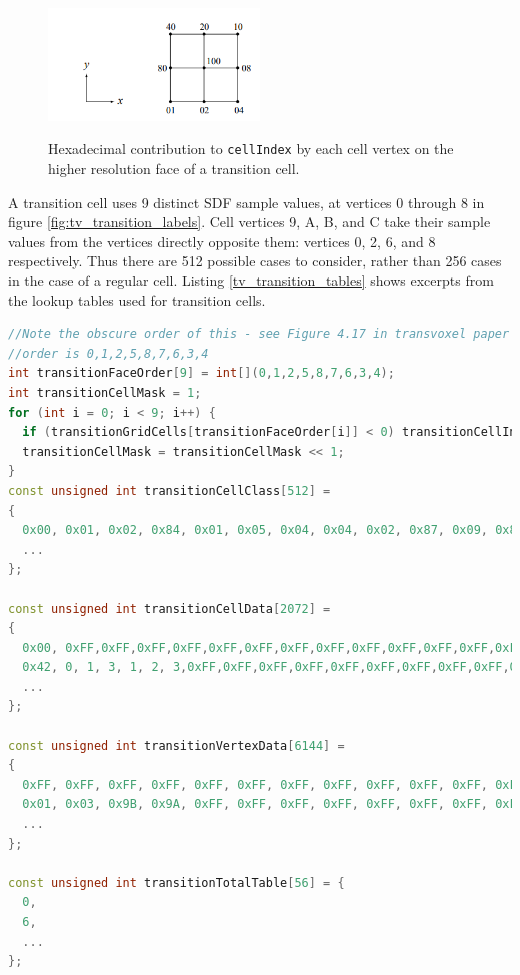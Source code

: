 \documentclass{article}
\begin{document}
\begin{figure}
  \caption{Hexadecimal contribution to \texttt{cellIndex} by each cell vertex on the higher resolution face of a transition cell.}
  \includegraphics[width=0.5\textwidth]{tv_transition_cellIndex.PNG}
  \label{fig:tv_transition_cellIndex}
\end{figure}


A transition cell uses 9 distinct SDF sample values, at vertices 0 through 8 in figure \ref{fig:tv_transition_labels}. Cell vertices 9, A, B, and C take their sample values from the vertices directly opposite them: vertices 0, 2, 6, and 8 respectively. Thus there are 512 possible cases to consider, rather than 256 cases in the case of a regular cell. Listing \ref{tv_transition_tables} shows excerpts from the lookup tables used for transition cells.

\begin{lstlisting}[language=C++, label={tv_transition_tables}, caption={Calculation of \texttt{transitionCellIndex}, and lookup tables for transition cells in the Transvoxel algorithm. An example of their usage is given below.}]
//Note the obscure order of this - see Figure 4.17 in transvoxel paper
//order is 0,1,2,5,8,7,6,3,4
int transitionFaceOrder[9] = int[](0,1,2,5,8,7,6,3,4);
int transitionCellMask = 1;
for (int i = 0; i < 9; i++) {
  if (transitionGridCells[transitionFaceOrder[i]] < 0) transitionCellIndex |= transitionCellMask;
  transitionCellMask = transitionCellMask << 1;
}
const unsigned int transitionCellClass[512] =
{
  0x00, 0x01, 0x02, 0x84, 0x01, 0x05, 0x04, 0x04, 0x02, 0x87, 0x09, 0x8C, 0x84, 0x0B, 0x05, 0x05,
  ...
};

const unsigned int transitionCellData[2072] =
{
  0x00, 0xFF,0xFF,0xFF,0xFF,0xFF,0xFF,0xFF,0xFF,0xFF,0xFF,0xFF,0xFF,0xFF,0xFF,0xFF,0xFF,0xFF,0xFF,0xFF,0xFF,0xFF,0xFF,0xFF,0xFF,0xFF,0xFF,0xFF,0xFF,0xFF,0xFF,0xFF,0xFF,0xFF,0xFF,0xFF,0xFF,
  0x42, 0, 1, 3, 1, 2, 3,0xFF,0xFF,0xFF,0xFF,0xFF,0xFF,0xFF,0xFF,0xFF,0xFF,0xFF,0xFF,0xFF,0xFF,0xFF,0xFF,0xFF,0xFF,0xFF,0xFF,0xFF,0xFF,0xFF,0xFF,0xFF,0xFF,0xFF,0xFF,0xFF,0xFF,
  ...
};

const unsigned int transitionVertexData[6144] =
{
  0xFF, 0xFF, 0xFF, 0xFF, 0xFF, 0xFF, 0xFF, 0xFF, 0xFF, 0xFF, 0xFF, 0xFF,
  0x01, 0x03, 0x9B, 0x9A, 0xFF, 0xFF, 0xFF, 0xFF, 0xFF, 0xFF, 0xFF, 0xFF,
  ...
};

const unsigned int transitionTotalTable[56] = {
  0,
  6,
  ...
};       
\end{lstlisting}
\end{document}
